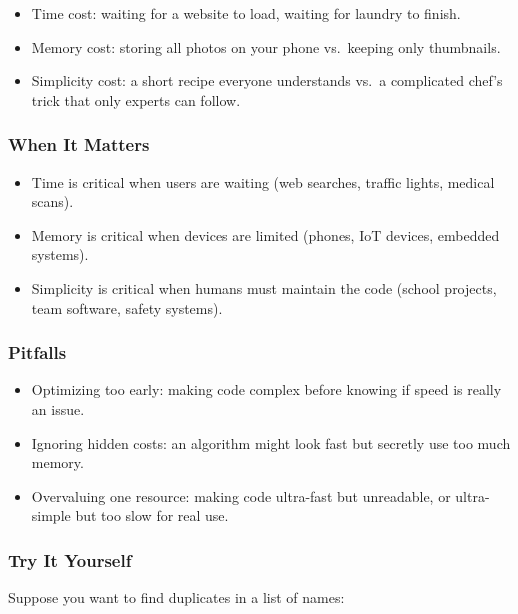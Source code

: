 \documentclass[
  letterpaper,
  DIV=11,
  numbers=noendperiod]{scrreprt}
\providecommand{\tightlist}{%
  \setlength{\itemsep}{0pt}\setlength{\parskip}{0pt}}
\begin{document}
\begin{itemize}
\tightlist
\item
  Time cost: waiting for a website to load, waiting for laundry to
  finish.
\item
  Memory cost: storing all photos on your phone vs.~keeping only
  thumbnails.
\item
  Simplicity cost: a short recipe everyone understands vs.~a complicated
  chef's trick that only experts can follow.
\end{itemize}

\subsubsection{When It Matters}\label{when-it-matters-5}

\begin{itemize}
\tightlist
\item
  Time is critical when users are waiting (web searches, traffic lights,
  medical scans).
\item
  Memory is critical when devices are limited (phones, IoT devices,
  embedded systems).
\item
  Simplicity is critical when humans must maintain the code (school
  projects, team software, safety systems).
\end{itemize}

\subsubsection{Pitfalls}\label{pitfalls-4}

\begin{itemize}
\tightlist
\item
  Optimizing too early: making code complex before knowing if speed is
  really an issue.
\item
  Ignoring hidden costs: an algorithm might look fast but secretly use
  too much memory.
\item
  Overvaluing one resource: making code ultra-fast but unreadable, or
  ultra-simple but too slow for real use.
\end{itemize}

\subsubsection{Try It Yourself}\label{try-it-yourself-7}

Suppose you want to find duplicates in a list of names:
\end{document}
